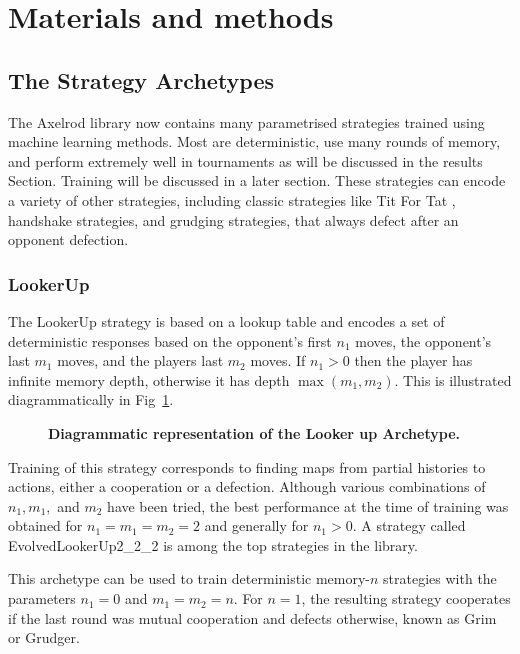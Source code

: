 \documentclass[10pt,letterpaper]{article}
\begin{document}
\section*{Materials and methods}
\subsection*{The Strategy Archetypes}

The Axelrod library now contains many parametrised strategies trained using
machine learning
methods. Most are deterministic, use many rounds of memory, and perform
extremely well in tournaments as will be discussed in the results Section.
Training will be discussed in a later section.
These strategies can encode a variety
of other strategies, including classic strategies like Tit For Tat
\cite{Axelrod1980},
handshake strategies, and grudging strategies, that always defect after
an opponent defection.

\subsubsection*{LookerUp}\label{sec:lookerup}

The LookerUp strategy is based on a lookup table and encodes a set of
deterministic responses based on the opponent's first $n_1$ moves, the
opponent's last $m_1$ moves, and the players last $m_2$ moves. If $n_1 > 0$ then
the player has infinite memory depth, otherwise it has depth $\max(m_1, m_2)$.
This is illustrated diagrammatically in Fig~\ref{fig:lookerup}.

\begin{figure}[!hbtp]
    \centering
    \caption{\bf Diagrammatic representation of the Looker up Archetype.}
    \label{fig:lookerup}
\end{figure}

Training of this strategy corresponds to finding maps from partial histories to
actions, either a cooperation or a defection. Although various
combinations of $n_1, m_1,$ and $m_2$ have been tried, the best performance at
the time of
training was obtained for $n_1 = m_1 = m_2 = 2$ and generally for $n_1 > 0$.
A strategy
called EvolvedLookerUp2\_2\_2 is among the top strategies in the library.

This archetype can be used to train deterministic memory-$n$ strategies with the
parameters $n_1=0$ and $m_1=m_2=n$. For $n=1$, the resulting strategy cooperates
if the last round was mutual cooperation and defects otherwise, known as Grim or
Grudger.
\end{document}
